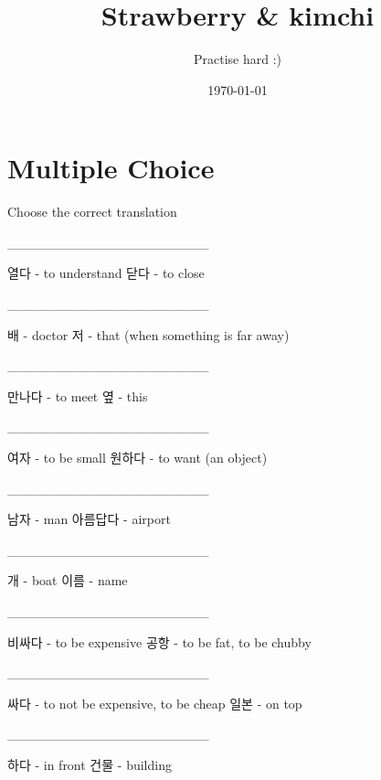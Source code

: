 \documentclass[addpoints, 30pt]{../exam}%
\title{Strawberry \& kimchi}%
\author{Practise hard :)}%
\date{\today}%
\begin{document}
%
\normalsize%
\maketitle%
\section{Multiple Choice}%
Choose the correct translation%
\begin{questions}%
\question[1]%
\_\_\_\_\_\_\_\_\_\_\_\_\_\_\_\_\_\_\_\_\_%
\begin{choices}%
\choice%
열다 {-} to understand%
\CorrectChoice%
닫다 {-} to close%
\end{choices}%
\question[1]%
\_\_\_\_\_\_\_\_\_\_\_\_\_\_\_\_\_\_\_\_\_%
\begin{choices}%
\choice%
배 {-} doctor%
\CorrectChoice%
저 {-} that (when something is far away)%
\end{choices}%
\question[1]%
\_\_\_\_\_\_\_\_\_\_\_\_\_\_\_\_\_\_\_\_\_%
\begin{choices}%
\CorrectChoice%
만나다 {-} to meet%
\choice%
옆 {-} this%
\end{choices}%
\question[1]%
\_\_\_\_\_\_\_\_\_\_\_\_\_\_\_\_\_\_\_\_\_%
\begin{choices}%
\choice%
여자 {-} to be small%
\CorrectChoice%
원하다 {-} to want (an object)%
\end{choices}%
\question[1]%
\_\_\_\_\_\_\_\_\_\_\_\_\_\_\_\_\_\_\_\_\_%
\begin{choices}%
\CorrectChoice%
남자 {-} man%
\choice%
아름답다 {-} airport%
\end{choices}%
\question[1]%
\_\_\_\_\_\_\_\_\_\_\_\_\_\_\_\_\_\_\_\_\_%
\begin{choices}%
\choice%
개 {-} boat%
\CorrectChoice%
이름 {-} name%
\end{choices}%
\question[1]%
\_\_\_\_\_\_\_\_\_\_\_\_\_\_\_\_\_\_\_\_\_%
\begin{choices}%
\CorrectChoice%
비싸다 {-} to be expensive%
\choice%
공항 {-} to be fat, to be chubby%
\end{choices}%
\question[1]%
\_\_\_\_\_\_\_\_\_\_\_\_\_\_\_\_\_\_\_\_\_%
\begin{choices}%
\CorrectChoice%
싸다 {-} to not be expensive, to be cheap%
\choice%
일본 {-} on top%
\end{choices}%
\question[1]%
\_\_\_\_\_\_\_\_\_\_\_\_\_\_\_\_\_\_\_\_\_%
\begin{choices}%
\choice%
하다 {-} in front%
\CorrectChoice%
건물 {-} building%
\end{choices}%

\end{questions}
\end{document}
